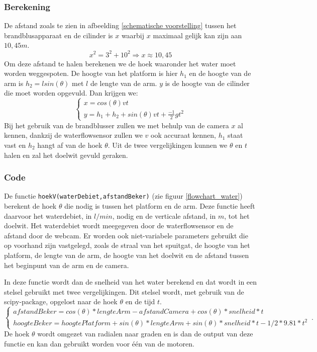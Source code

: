 \documentclass[kulak]{kulakarticle} %
\begin{document}
\subsubsection{Berekening}
De afstand zoals te zien in afbeelding \ref{schematische voorstelling} tussen het brandblusapparaat en de cilinder is \(x\) waarbij \(x\) maximaal gelijk kan zijn aan \(10,45 m\).
\begin{equation}
	x^2 = 3^2 + 10^2
	\Rightarrow x \approx 10,45 
\end{equation}
Om deze afstand te halen berekenen we de hoek waaronder het water moet worden weggespoten. De hoogte van het platform is hier \(h_1\) en de hoogte van de arm is \(h_2 = lsin(\theta)\) met \(l\) de lengte van de arm. \(y\) is de hoogte van de cilinder die moet worden opgevuld. Dan krijgen we:
\begin{equation}
	\begin{cases}
		x  = cos(\theta) v t \\
		y = h_1 + h_2 + sin(\theta) v t + \frac{-1}{2} g t^2
	\end{cases}
\end{equation}
Bij het gebruik van de brandblusser zullen we met behulp van de camera \(x\) al kennen, dankzij de waterflowsensor zullen we \(v\) ook accuraat kennen, \(h_1\) staat vast en \(h_2\) hangt af van de hoek \(\theta\). Uit de twee vergelijkingen kunnen we \(\theta\) en \(t\) halen en zal het doelwit gevuld geraken.

\subsubsection{Code}
De functie \verb*|hoekV(waterDebiet,afstandBeker)| (zie figuur \ref{flowchart_water}) berekent de hoek \(\theta\)  die nodig is tussen het platform en de arm. Deze functie heeft daarvoor het waterdebiet, in \(l/min\), nodig en de verticale afstand, in \(m\), tot het doelwit. Het waterdebiet wordt meegegeven door de waterflowsensor en de afstand door de webcam. Er worden ook niet-variabele parameters gebruikt die op voorhand zijn vastgelegd, zoals de straal van het spuitgat, de hoogte van het platform, de lengte van de arm, de hoogte van het doelwit en de afstand tussen het beginpunt van de arm en de camera. 

In deze functie wordt dan de snelheid van het water berekend en dat wordt in een stelsel gebruikt met twee vergelijkingen. Dit stelsel wordt, met gebruik van de scipy-package, opgelost naar de hoek \(\theta\) en de tijd \(t\).
\begin{equation}
	\begin{cases}
		afstandBeker  = cos(\theta )*lengteArm - afstandCamera + cos(\theta )*snelheid*t \\ 
		hoogteBeker  =  hoogtePlatform + sin(\theta )*lengteArm + sin(\theta )*snelheid*t - 1/2*9.81*t^2
	\end{cases}\,.
\end{equation}
De hoek \(\theta\) wordt omgezet van radialen naar graden en is dan de output van deze functie en kan dan gebruikt worden voor één van de motoren.
\end{document}
